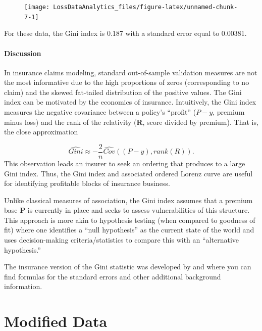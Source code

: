 \documentclass[]{book}
\let\oldparagraph\paragraph
\renewcommand{\paragraph}[1]{\oldparagraph{#1}\mbox{}}
\theoremstyle{definition}
\theoremstyle{definition}
\theoremstyle{definition}
\theoremstyle{remark}
\begin{document}
\begin{figure}

{\centering \texttt{[image: LossDataAnalytics\_files/figure-latex/unnamed-chunk-7-1]} 

}

\end{figure}

For these data, the Gini index is 0.187 with a standard error equal to
0.00381.

\paragraph{Discussion}\label{discussion}

In insurance claims modeling, standard out-of-sample validation measures
are not the most informative due to the high proportions of zeros
(corresponding to no claim) and the skewed fat-tailed distribution of
the positive values. The Gini index can be motivated by the economics of
insurance. Intuitively, the Gini index measures the negative covariance
between a policy's ``profit'' (\(P-y\), premium minus loss) and the rank
of the relativity (\textbf{R}, score divided by premium). That is, the
close approximation

\[\widehat{Gini} \approx - \frac{2}{n} \widehat{Cov} \left( (P-y), rank(R) \right) .\]
This observation leads an insurer to seek an ordering that produces to a
large Gini index. Thus, the Gini index and associated ordered Lorenz
curve are useful for identifying profitable blocks of insurance
business.

Unlike classical measures of association, the Gini index assumes that a
premium base \textbf{P} is currently in place and seeks to assess
vulnerabilities of this structure. This approach is more akin to
hypothesis testing (when compared to goodness of fit) where one
identifies a ``null hypothesis'' as the current state of the world and
uses decision-making criteria/statistics to compare this with an
``alternative hypothesis.''

The insurance version of the Gini statistic was developed by
\citep{frees2011summarizing} and \citep{frees2014insurance} where you
can find formulas for the standard errors and other additional
background information.

\section{Modified Data}\label{S:ModifiedData}
\end{document}
